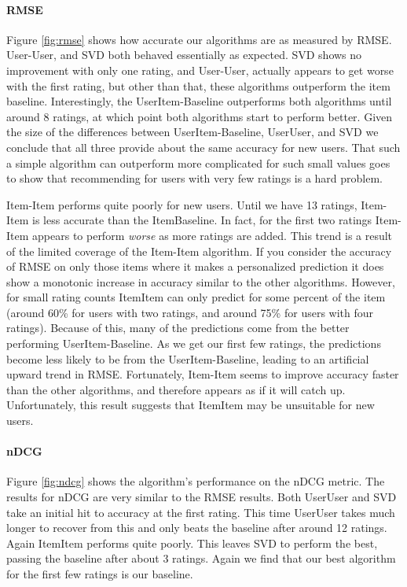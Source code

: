 \documentclass[letterpaper]{sig-alternate}
\begin{document}
  \paragraph{RMSE}
  Figure \ref{fig:rmse} shows how accurate our algorithms are as measured by RMSE.
  User-User, and SVD both behaved essentially as expected.
  SVD shows no improvement with only one rating, and User-User, actually appears to get worse with the first rating, but other than that, these algorithms outperform the item baseline.
  Interestingly, the UserItem-Baseline outperforms both algorithms until around 8 ratings, at which point both algorithms start to perform better.
  Given the size of the differences between UserItem-Baseline, UserUser, and SVD we conclude that all three provide about the same accuracy for new users.
  That such a simple algorithm can outperform more complicated for such small values goes to show that recommending for users with very few ratings is a hard problem.
  
  Item-Item performs quite poorly for new users.
  Until we have 13 ratings, Item-Item is less accurate than the ItemBaseline.
  In fact, for the first two ratings Item-Item appears to perform \emph{worse} as more ratings are added.
  This trend is a result of the limited coverage of the Item-Item algorithm.
  If you consider the accuracy of RMSE on only those items where it makes a personalized prediction it does show a monotonic increase in accuracy similar to the other algorithms.
  However, for small rating counts ItemItem can only predict for some percent of the item (around 60\% for users with two ratings, and around 75\% for users with four ratings).
  Because of this, many of the predictions come from the better performing UserItem-Baseline.
  As we get our first few ratings, the predictions become less likely to be from the UserItem-Baseline, leading to an artificial upward trend in RMSE.
  Fortunately, Item-Item seems to improve accuracy faster than the other algorithms, and therefore appears as if it will catch up.
  Unfortunately, this result suggests that ItemItem may be unsuitable for new users.


  \paragraph{nDCG}
  Figure \ref{fig:ndcg} shows the algorithm's performance on the nDCG metric.
  The results for nDCG are very similar to the RMSE results.
  Both UserUser and SVD take an initial hit to accuracy at the first rating.
  This time UserUser takes much longer to recover from this and only beats the baseline after around 12 ratings.
  Again ItemItem performs quite poorly.
  This leaves SVD to perform the best, passing the baseline after about 3 ratings.
  Again we find that our best algorithm for the first few ratings is our baseline.
  
\end{document}
